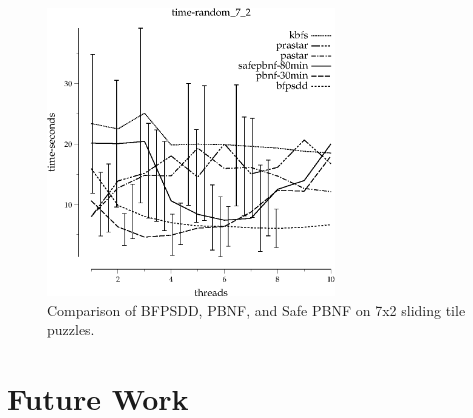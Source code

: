 \documentclass{article}
\begin{document}
\begin{figure}[h!]
\includegraphics[width=3in]{../graphs/seth/time-random_7_2.eps}
\caption{Comparison of BFPSDD, PBNF, and Safe PBNF on 7x2 sliding tile puzzles.}
\label{fig:comp-tile}
\end{figure}
\section{Future Work}
\end{document}
